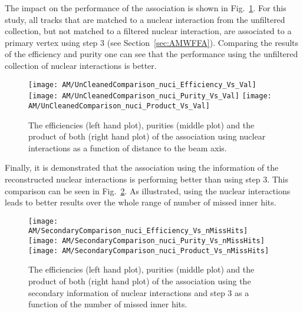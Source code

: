 The impact on the performance of the association is shown in Fig.~\ref{plot:AMWFSVnuciEffAndPurRT}. For this study, all tracks that are matched to a nuclear interaction from the unfiltered collection, but not matched to a filtered nuclear interaction, are associated to a primary vertex using step 3 (see Section~\ref{sec:AMWFFA}). Comparing the results of the efficiency and purity one can see that the performance using the unfiltered collection of nuclear interactions is better.

\begin{figure}[Ht]
    \centering
    \texttt{[image: AM/UnCleanedComparison\_nuci\_Efficiency\_Vs\_Val]}
    \texttt{[image: AM/UnCleanedComparison\_nuci\_Purity\_Vs\_Val]}
    \texttt{[image: AM/UnCleanedComparison\_nuci\_Product\_Vs\_Val]}
    \caption[Efficiencies, purities and their product of the association using different nuclear interaction collections as a function of distance to the beam axis]{The efficiencies (left hand plot), purities (middle plot) and the product of both (right hand plot) of the association using nuclear interactions as a function of distance to the beam axis. \label{plot:AMWFSVnuciEffAndPurRT}}
\end{figure}

Finally, it is demonstrated that the association using the information of the reconstructed nuclear interactions is performing better than using step 3. This comparison can be seen in Fig.~\ref{plot:AMWFSVnuciEffAndPurVsFA}. As illustrated, using the nuclear interactions leads to better results over the whole range of number of missed inner hits.

\begin{figure}[Ht]
    \centering
    \texttt{[image: AM/SecondaryComparison\_nuci\_Efficiency\_Vs\_nMissHits]}
    \texttt{[image: AM/SecondaryComparison\_nuci\_Purity\_Vs\_nMissHits]}
    \texttt{[image: AM/SecondaryComparison\_nuci\_Product\_Vs\_nMissHits]}
    \caption[Efficiencies, purities and their product of the association using nuclear interactions \vs{} step 3 as a function of missed inner hits]{The efficiencies (left hand plot), purities (middle plot) and the product of both (right hand plot) of the association using the secondary information of nuclear interactions and step 3 as a function of the number of missed inner hits.\label{plot:AMWFSVnuciEffAndPurVsFA}}
\end{figure}

